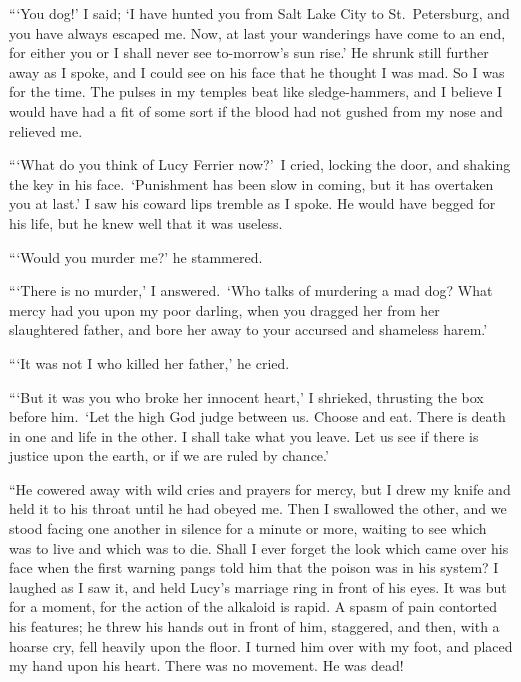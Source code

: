 \documentclass[12pt,english]{book}
\begin{document}
{}```You dog!' I said; `I have hunted you from Salt Lake City to
St.\ Petersburg, and you have always escaped me. Now, at last your
wanderings have come to an end, for either you or I shall never see
to-morrow's sun rise.' He shrunk still further away as I spoke, and
I could see on his face that he thought I was mad. So I was for the
time. The pulses in my temples beat like sledge-hammers, and I believe
I would have had a fit of some sort if the blood had not gushed from
my nose and relieved me.

{}```What do you think of Lucy Ferrier now?'\ I cried, locking the
door, and shaking the key in his face.\  `Punishment has been slow
in coming, but it has overtaken you at last.' I saw his coward lips
tremble as I spoke. He would have begged for his life, but he knew
well that it was useless.

{}```Would you murder me?' he stammered.

{}```There is no murder,' I answered.\  `Who talks of murdering
a mad dog? What mercy had you upon my poor darling, when you dragged
her from her slaughtered father, and bore her away to your accursed
and shameless harem.'

{}```It was not I who killed her father,' he cried.

{}```But it was you who broke her innocent heart,' I shrieked, thrusting
the box before him.\  `Let the high God judge between us. Choose
and eat. There is death in one and life in the other. I shall take
what you leave. Let us see if there is justice upon the earth, or
if we are ruled by chance.'

{}``He cowered away with wild cries and prayers for mercy, but I
drew my knife and held it to his throat until he had obeyed me. Then
I swallowed the other, and we stood facing one another in silence
for a minute or more, waiting to see which was to live and which was
to die. Shall I ever forget the look which came over his face when
the first warning pangs told him that the poison was in his system?
I laughed as I saw it, and held Lucy's marriage ring in front of his
eyes. It was but for a moment, for the action of the alkaloid is rapid.
A spasm of pain contorted his features; he threw his hands out in
front of him, staggered, and then, with a hoarse cry, fell heavily
upon the floor. I turned him over with my foot, and placed my hand
upon his heart. There was no movement. He was dead!
\end{document}
